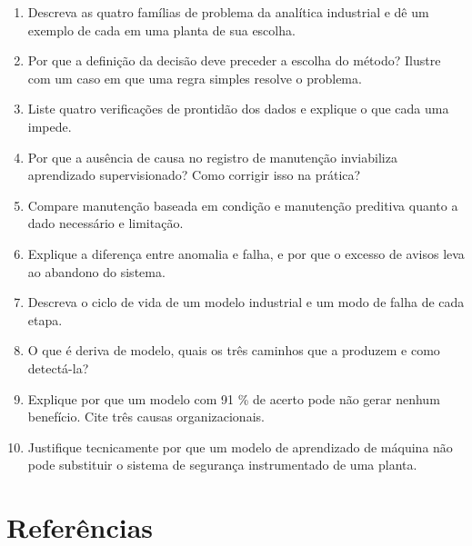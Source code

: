 \begin{enumerate}
\def\labelenumi{\arabic{enumi}.}
\tightlist
\item
  Descreva as quatro famílias de problema da analítica industrial e dê um exemplo de cada em uma planta de sua escolha.
\item
  Por que a definição da decisão deve preceder a escolha do método? Ilustre com um caso em que uma regra simples resolve o problema.
\item
  Liste quatro verificações de prontidão dos dados e explique o que cada uma impede.
\item
  Por que a ausência de causa no registro de manutenção inviabiliza aprendizado supervisionado? Como corrigir isso na prática?
\item
  Compare manutenção baseada em condição e manutenção preditiva quanto a dado necessário e limitação.
\item
  Explique a diferença entre anomalia e falha, e por que o excesso de avisos leva ao abandono do sistema.
\item
  Descreva o ciclo de vida de um modelo industrial e um modo de falha de cada etapa.
\item
  O que é deriva de modelo, quais os três caminhos que a produzem e como detectá-la?
\item
  Explique por que um modelo com 91 \% de acerto pode não gerar nenhum benefício. Cite três causas organizacionais.
\item
  Justifique tecnicamente por que um modelo de aprendizado de máquina não pode substituir o sistema de segurança instrumentado de uma planta.
\end{enumerate}

\section{Referências}\label{referuxeancias}


